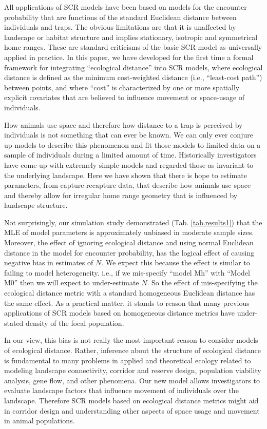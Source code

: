 \documentclass[12pt]{article}
\begin{document}
All applications of SCR models have been based on models for the
encounter probability that are functions of
the standard Euclidean distance between
individuals and traps. The obvious limitations are that it is
unaffected by landscape or habitat structure and implies
stationary,  isotropic and symmetrical home ranges. These are standard
criticisms of the basic SCR model as universally applied in practice.
In this paper,  we have developed for the first time a formal framework
for integrating
``ecological distance'' into SCR models, where ecological distance is
defined as the minimum cost-weighted distance (i.e., ``least-cost path'') between points, and where ``cost''
is characterized by one or more spatially explicit covariates that are
believed to influence movement or space-usage of individuals.

How animals use space and therefore how distance to a trap is
perceived by individuals is not something that can ever be known. We
can only ever conjure up models to describe this
phenomenon and fit those models to limited data on a sample of individuals
during a limited amount of time.
Historically investigators have come up with extremely simple
models and regarded those as invariant to
the underlying landscape. Here we have shown that there is hope to
estimate parameters, from capture-recapture data,
 that describe how animals use space and thereby
allow for irregular home range geometry that is influenced by
landscape structure.

Not surprisingly, our simulation study demonstrated 
(Tab. \ref{tab.results1})
that the MLE of model
parameters is approximately unbiased in moderate sample
sizes. Moreover, the
effect of ignoring ecological distance and using normal Euclidean
distance in the model for encounter probability, has the
logical effect of causing negative bias
in estimates of $N$. 
We expect this because the effect is similar to
failing to model heterogeneity. i.e., if we mis-specify ``model Mh'' \citep{otis_etal:1978} with
``Model M0'' \citep{otis_etal:1978} then we will expect to under-estimate $N$. So the effect of
mis-specifying the ecological distance metric with a standard
homogeneous Euclidean distance has the same effect. As a practical matter,
it stands to reason that many previous applications of SCR models based
on homogeneous distance metrics have under-stated density of the focal
population.

In our view, this bias is not really the most important reason to consider models of
ecological distance. Rather, inference about the structure of
ecological distance is fundamental to many problems in applied and
theoretical ecology related to modeling landscape
connectivity, corridor and reserve design, population viability
analysis, gene flow, and other phenomena.
Our new model
allows investigators to  evaluate landscape
factors that influence movement of individuals over the landscape. 
Therefore SCR models based on ecological distance metrics might aid in
corridor design and understanding other aspects of space usage and
movement in animal populations.
\end{document}
